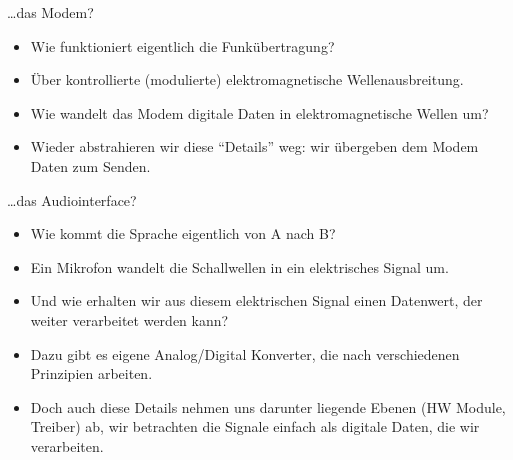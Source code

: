\begin{frame}

	\begin{block}{\ldots das Modem?}
		\begin{itemize}
			\item Wie funktioniert eigentlich die Funkübertragung?
			\item Über kontrollierte (modulierte) elektromagnetische
				Wellenausbreitung.
			\item Wie wandelt das Modem digitale Daten in elektromagnetische
				Wellen um?
			\item Wieder abstrahieren wir diese ``Details'' weg: \alert<2->{wir
					übergeben dem Modem Daten zum Senden.}
		\end{itemize}
	\end{block}

\end{frame}

\begin{frame}

	\begin{block}{\ldots das Audiointerface?}
		\begin{itemize}
			\item Wie kommt die Sprache eigentlich von A nach B?
			\item Ein Mikrofon wandelt die Schallwellen in ein elektrisches
				Signal um.
			\item Und wie erhalten wir aus diesem elektrischen Signal einen Datenwert, der
				weiter verarbeitet werden kann?
			\item Dazu gibt es eigene Analog/Digital Konverter, die nach
				verschiedenen Prinzipien arbeiten.
			\item Doch auch diese Details nehmen uns darunter liegende Ebenen
				(HW Module, Treiber) ab, \alert<2->{wir betrachten die Signale
				einfach als digitale Daten, die wir verarbeiten.}
		\end{itemize}
	\end{block}
\end{frame}

